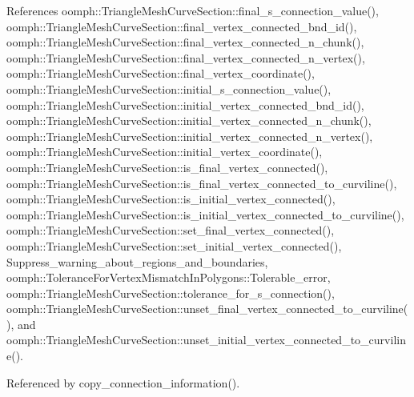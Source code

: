 References oomph\+::\+Triangle\+Mesh\+Curve\+Section\+::final\+\_\+s\+\_\+connection\+\_\+value(), oomph\+::\+Triangle\+Mesh\+Curve\+Section\+::final\+\_\+vertex\+\_\+connected\+\_\+bnd\+\_\+id(), oomph\+::\+Triangle\+Mesh\+Curve\+Section\+::final\+\_\+vertex\+\_\+connected\+\_\+n\+\_\+chunk(), oomph\+::\+Triangle\+Mesh\+Curve\+Section\+::final\+\_\+vertex\+\_\+connected\+\_\+n\+\_\+vertex(), oomph\+::\+Triangle\+Mesh\+Curve\+Section\+::final\+\_\+vertex\+\_\+coordinate(), oomph\+::\+Triangle\+Mesh\+Curve\+Section\+::initial\+\_\+s\+\_\+connection\+\_\+value(), oomph\+::\+Triangle\+Mesh\+Curve\+Section\+::initial\+\_\+vertex\+\_\+connected\+\_\+bnd\+\_\+id(), oomph\+::\+Triangle\+Mesh\+Curve\+Section\+::initial\+\_\+vertex\+\_\+connected\+\_\+n\+\_\+chunk(), oomph\+::\+Triangle\+Mesh\+Curve\+Section\+::initial\+\_\+vertex\+\_\+connected\+\_\+n\+\_\+vertex(), oomph\+::\+Triangle\+Mesh\+Curve\+Section\+::initial\+\_\+vertex\+\_\+coordinate(), oomph\+::\+Triangle\+Mesh\+Curve\+Section\+::is\+\_\+final\+\_\+vertex\+\_\+connected(), oomph\+::\+Triangle\+Mesh\+Curve\+Section\+::is\+\_\+final\+\_\+vertex\+\_\+connected\+\_\+to\+\_\+curviline(), oomph\+::\+Triangle\+Mesh\+Curve\+Section\+::is\+\_\+initial\+\_\+vertex\+\_\+connected(), oomph\+::\+Triangle\+Mesh\+Curve\+Section\+::is\+\_\+initial\+\_\+vertex\+\_\+connected\+\_\+to\+\_\+curviline(), oomph\+::\+Triangle\+Mesh\+Curve\+Section\+::set\+\_\+final\+\_\+vertex\+\_\+connected(), oomph\+::\+Triangle\+Mesh\+Curve\+Section\+::set\+\_\+initial\+\_\+vertex\+\_\+connected(), Suppress\+\_\+warning\+\_\+about\+\_\+regions\+\_\+and\+\_\+boundaries, oomph\+::\+Tolerance\+For\+Vertex\+Mismatch\+In\+Polygons\+::\+Tolerable\+\_\+error, oomph\+::\+Triangle\+Mesh\+Curve\+Section\+::tolerance\+\_\+for\+\_\+s\+\_\+connection(), oomph\+::\+Triangle\+Mesh\+Curve\+Section\+::unset\+\_\+final\+\_\+vertex\+\_\+connected\+\_\+to\+\_\+curviline(), and oomph\+::\+Triangle\+Mesh\+Curve\+Section\+::unset\+\_\+initial\+\_\+vertex\+\_\+connected\+\_\+to\+\_\+curviline().



Referenced by copy\+\_\+connection\+\_\+information().

\mbox{\label{classoomph_1_1UnstructuredTwoDMeshGeometryBase_a66cbc8235c29cec41322f4e367a4e228}} 
